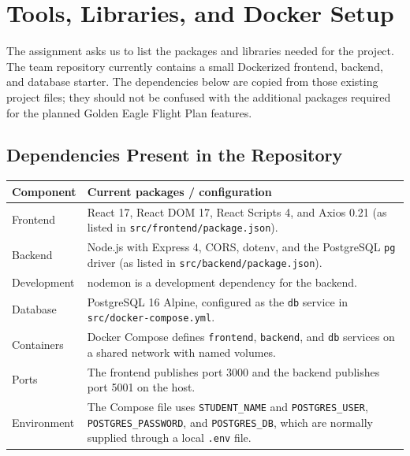 \newpage %
\section{Tools, Libraries, and Docker Setup}
The assignment asks us to list the packages and libraries needed for the project. The team repository currently contains a small Dockerized frontend, backend, and database starter. The dependencies below are copied from those existing project files; they should not be confused with the additional packages required for the planned Golden Eagle Flight Plan features.

\subsection{Dependencies Present in the Repository}
\begin{longtable}{L{0.25\textwidth}L{0.65\textwidth}}
\toprule Component & Current packages / configuration \\ \midrule
Frontend & React 17, React DOM 17, React Scripts 4, and Axios 0.21 (as listed in \texttt{src/frontend/package.json}). \\
Backend & Node.js with Express 4, CORS, dotenv, and the PostgreSQL \texttt{pg} driver (as listed in \texttt{src/backend/package.json}). \\
Development & nodemon is a development dependency for the backend. \\
Database & PostgreSQL 16 Alpine, configured as the \texttt{db} service in \texttt{src/docker-compose.yml}. \\
Containers & Docker Compose defines \texttt{frontend}, \texttt{backend}, and \texttt{db} services on a shared network with named volumes. \\
Ports & The frontend publishes port 3000 and the backend publishes port 5001 on the host. \\
Environment & The Compose file uses \texttt{STUDENT\_NAME} and \texttt{POSTGRES\_USER}, \texttt{POSTGRES\_PASSWORD}, and \texttt{POSTGRES\_DB}, which are normally supplied through a local \texttt{.env} file. \\
\bottomrule
\end{longtable}

